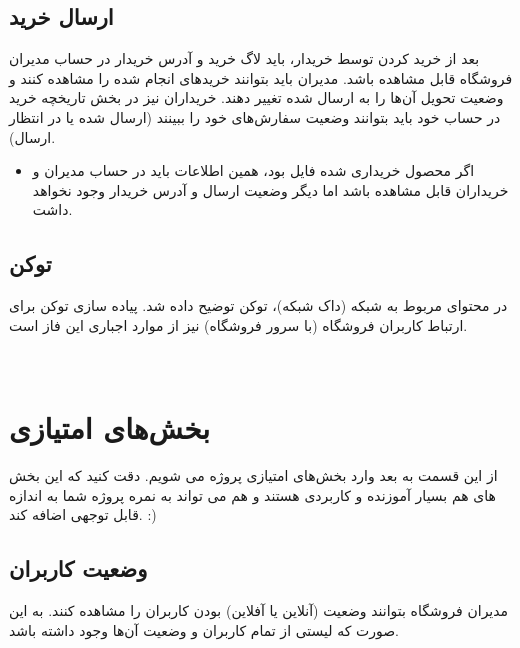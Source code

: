 \documentclass[]{article}
\begin{document}
\subsection*{{\titr ارسال خرید}}

بعد از خرید کردن توسط خریدار، باید لاگ خرید و آدرس خریدار در حساب مدیران فروشگاه قابل مشاهده باشد. مدیران باید بتوانند خرید‌های انجام شده را مشاهده کنند و وضعیت تحویل آن‌ها را به ارسال شده تغییر دهند. خریداران نیز در بخش تاریخچه خرید در حساب خود باید بتوانند وضعیت سفارش‌های خود را ببینند (‌ارسال شده یا در انتظار ارسال).

\begin{itemize}
\item
اگر محصول خریداری شده فایل بود، همین اطلاعات باید در حساب مدیران و خریداران قابل مشاهده باشد اما دیگر وضعیت ارسال و آدرس خریدار وجود نخواهد داشت.
\end{itemize}

\subsection*{{\titr توکن}}

در محتوای مربوط به شبکه (داک شبکه)، توکن توضیح داده شد. پیاده سازی توکن برای ارتباط کاربران فروشگاه (‌با سرور فروشگاه)‌ نیز از موارد اجباری این فاز است.


\newpage


 \Large \textbf{\\
}
\section*{{\titr بخش‌های امتیازی}}

از این قسمت به بعد وارد بخش‌های امتیازی پروژه می شویم. دقت کنید که این بخش های هم بسیار آموزنده و کاربردی هستند و هم می تواند به نمره پروژه شما به اندازه قابل توجهی اضافه کند. :)


\subsection*{{\titr وضعیت کاربران}}

مدیران فروشگاه بتوانند وضعیت (‌آنلاین یا آفلاین) بودن کاربران را مشاهده کنند. به این صورت که لیستی از تمام کاربران و وضعیت آن‌ها وجود داشته باشد.
\end{document}
